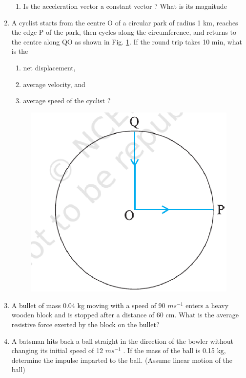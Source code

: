 \begin{enumerate}[label=\arabic*.,ref=\thesection.\theenumi]
\begin{enumerate}
\item  Is the acceleration vector a constant vector ? What is its magnitude
\end{enumerate}
\item A cyclist starts from the centre O of a circular park of radius 1 km, reaches the edge P of the park, then cycles along the circumference, and returns to the centre along QO as shown in Fig. \ref{fig:4.21}. If the round trip takes 10 min, what is the 
\begin{enumerate}
\item  net displacement, 
\item  average velocity, and 
\item  average speed of the cyclist ?
\end{enumerate}
\begin{figure}[!ht]
\centering
\includegraphics[width=\columnwidth]{./figs/11-1/4.21.eps}
\caption{}
\label{fig:4.21}
\end{figure} 
%
\item  A bullet of mass 0.04 kg moving with a speed of 90 $m s^{-1}$
enters a
heavy wooden block and is stopped after a distance of 60 cm. What is the average resistive force exerted by the block on the bullet?
\item A batsman hits back a ball straight in the direction of the bowler without changing its initial speed of 12 $m s^{-1}$
.
If the mass of the ball is 0.15 kg, determine the impulse imparted to the ball. (Assume linear motion of the ball)

\end{enumerate}
